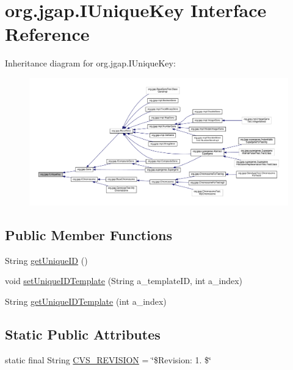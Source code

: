 \hypertarget{interfaceorg_1_1jgap_1_1_i_unique_key}{\section{org.\-jgap.\-I\-Unique\-Key Interface Reference}
\label{interfaceorg_1_1jgap_1_1_i_unique_key}
}


Inheritance diagram for org.\-jgap.\-I\-Unique\-Key\-:
\nopagebreak
\begin{figure}[H]
\begin{center}
\leavevmode
\includegraphics[width=350pt]{interfaceorg_1_1jgap_1_1_i_unique_key__inherit__graph}
\end{center}
\end{figure}
\subsection*{Public Member Functions}
\begin{DoxyCompactItemize}
\item 
String \hyperlink{interfaceorg_1_1jgap_1_1_i_unique_key_a1276412b558e169199771997a190f876}{get\-Unique\-I\-D} ()
\item 
void \hyperlink{interfaceorg_1_1jgap_1_1_i_unique_key_aeac223774f93ba6640bc07cc97a9ef4c}{set\-Unique\-I\-D\-Template} (String a\-\_\-template\-I\-D, int a\-\_\-index)
\item 
String \hyperlink{interfaceorg_1_1jgap_1_1_i_unique_key_af26fbe03487632a16c84b62325489652}{get\-Unique\-I\-D\-Template} (int a\-\_\-index)
\end{DoxyCompactItemize}
\subsection*{Static Public Attributes}
\begin{DoxyCompactItemize}
\item 
static final String \hyperlink{interfaceorg_1_1jgap_1_1_i_unique_key_a5b6472b1e40001ee262da59ee449a77b}{C\-V\-S\-\_\-\-R\-E\-V\-I\-S\-I\-O\-N} = \char`\"{}\$Revision\-: 1. \$\char`\"{}
\end{DoxyCompactItemize}


